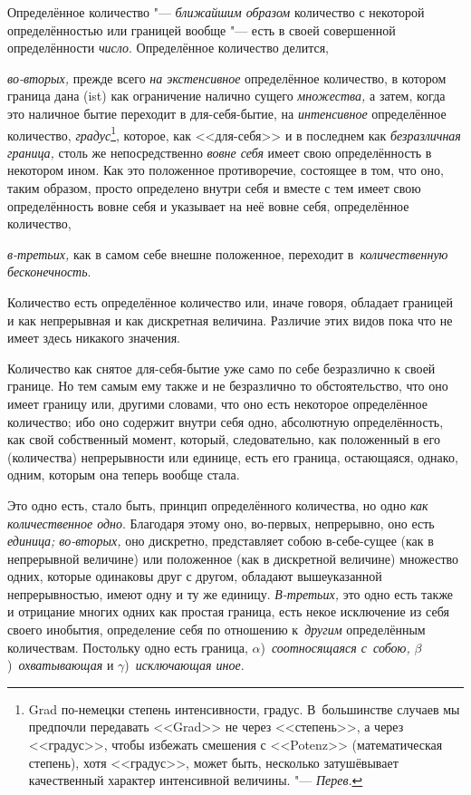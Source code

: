 Определённое количество "--- {\em ближайшим образом} количество с некоторой
определённостью или границей вообще "--- есть в своей совершенной
определённости {\em число}. Определённое количество делится,

{\em во-вторых,} прежде всего {\em на экстенсивное} определённое количество,
в котором граница дана (ist) как ограничение налично сущего {\em множества,}
а затем, когда это наличное бытие переходит в для-себя-бытие, на
{\em интенсивное} определённое количество, {\em градус}\footnote{Grad
по-немецки степень интенсивности, градус. В~большинстве случаев мы предпочли
передавать <<Grad>> не через <<степень>>, а через <<градус>>, чтобы избежать
смешения с <<Potenz>> (математическая степень), хотя <<градус>>, может быть,
несколько затушёвывает качественный характер интенсивной величины. "---
{\em Перев}.}, которое, как <<для-себя>> и в последнем как {\em безразличная
граница,} столь же непосредственно {\em вовне себя} имеет свою
определённость в некотором ином. Как это положенное противоречие, состоящее
в том, что оно, таким образом, просто определено внутри себя и вместе с тем
имеет свою определённость вовне себя и указывает на неё вовне себя, определённое
количество,

{\em в-третьих,} как в самом себе внешне положенное, переходит
в~{\em количественную бесконечность}.


Количество есть определённое количество или, иначе говоря, обладает границей
и как непрерывная и как дискретная величина. Различие этих видов пока что
не имеет здесь никакого значения.

Количество как снятое для-себя-бытие уже само по себе безразлично к своей
границе. Но тем самым ему также и не безразлично то обстоятельство, что оно
имеет границу или, другими словами, что оно есть некоторое определённое
количество; ибо оно содержит внутри себя одно, абсолютную определённость,
как свой собственный момент, который, следовательно, как положенный в его
(количества) непрерывности или единице, есть его граница, остающаяся,
однако, одним, которым она теперь вообще стала.

Это одно есть, стало быть, принцип определённого количества, но одно
{\em как количественное одно}. Благодаря этому оно, во-первых, непрерывно,
оно есть {\em единица; во-вторых,} оно дискретно, представляет собою
в-себе-сущее (как в непрерывной величине) или положенное (как в дискретной
величине) множество одних, которые одинаковы друг с другом, обладают
вышеуказанной непрерывностью, имеют одну и ту же единицу. {\em В-третьих,}
это одно есть также и отрицание многих одних как простая граница, есть некое
исключение из себя своего инобытия, определение себя по отношению
к~{\em другим} определённым количествам. Постольку одно есть граница,
$\alpha$)~{\em соотносящаяся с~собою,} $\beta$)~{\em охватывающая} и
$\gamma$)~{\em исключающая иное}.

